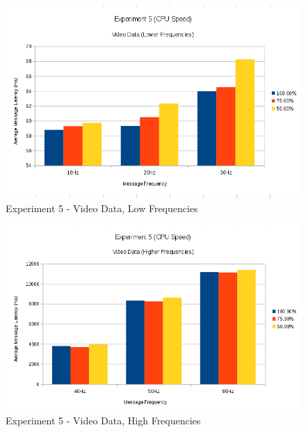 \documentclass[../dissertation.tex]{subfiles}
\begin{document}
\begin{figure}[H]
\centering
\includegraphics[width=\textwidth]{images/experiment5/video_data_low_freqs.png}
\caption{Experiment 5 - Video Data, Low Frequencies}
\label{exp5-video-means-low-freq}
\end{figure}

\begin{figure}[H]
\centering
\includegraphics[width=\textwidth]{images/experiment5/video_data_higher_freqs.png}
\caption{Experiment 5 - Video Data, High Frequencies}
\label{exp5-video-means-high-freq}
\end{figure}
\end{document}
